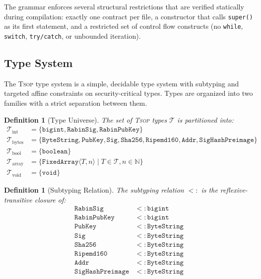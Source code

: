 \documentclass[11pt,a4paper]{article}
\newtheorem{definition}[theorem]{Definition}
\newcommand{\tsop}{\textsc{Tsop}}
\newcommand{\bs}{\texttt{ByteString}}
\newcommand{\bigintty}{\texttt{bigint}}
\newcommand{\boolty}{\texttt{boolean}}
\newcommand{\voidty}{\texttt{void}}
\newcommand{\subtype}{\mathrel{<:}}
\begin{document}
The grammar enforces several structural restrictions that are verified
statically during compilation: exactly one contract per file, a constructor
that calls \texttt{super()} as its first statement, and a restricted set of
control flow constructs (no \texttt{while}, \texttt{switch}, \texttt{try/catch},
or unbounded iteration).

\subsection{Type System}
\label{sec:types}

The \tsop{} type system is a simple, decidable type system with subtyping
and targeted affine constraints on security-critical types. Types are
organized into two families with a strict separation between them.

\begin{definition}[Type Universe]
The set of \tsop{} types $\mathcal{T}$ is partitioned into:
\begin{align}
\mathcal{T}_{\mathrm{int}} &= \{ \bigintty, \texttt{RabinSig}, \texttt{RabinPubKey} \} \\
\mathcal{T}_{\mathrm{bytes}} &= \{ \bs, \texttt{PubKey}, \texttt{Sig}, \texttt{Sha256}, \texttt{Ripemd160}, \texttt{Addr}, \texttt{SigHashPreimage} \} \\
\mathcal{T}_{\mathrm{bool}} &= \{ \boolty \} \\
\mathcal{T}_{\mathrm{array}} &= \{ \texttt{FixedArray}\langle T, n \rangle \mid T \in \mathcal{T}, n \in \mathbb{N} \} \\
\mathcal{T}_{\mathrm{void}} &= \{ \voidty \}
\end{align}
\end{definition}

\begin{definition}[Subtyping Relation]
\label{def:subtyping}
The subtyping relation $\subtype$ is the reflexive-transitive closure of:
\begin{align}
\texttt{RabinSig} &\subtype \bigintty \\
\texttt{RabinPubKey} &\subtype \bigintty \\
\texttt{PubKey} &\subtype \bs \\
\texttt{Sig} &\subtype \bs \\
\texttt{Sha256} &\subtype \bs \\
\texttt{Ripemd160} &\subtype \bs \\
\texttt{Addr} &\subtype \bs \\
\texttt{SigHashPreimage} &\subtype \bs
\end{align}
\end{definition}
\end{document}
